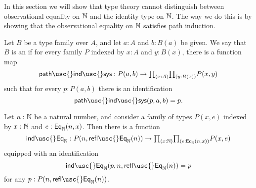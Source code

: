 In this section we will show that type theory cannot distinguish between observational equality on $\mathbb{N}$ and the identity type on $\mathbb{N}$. The way we do this is by showing that the observational equality on $\mathbb{N}$ satisfies path induction.

\begin{defn}
  Let $B$ be a type family over $A$, and let $a:A$ and $b:B(a)$ be given. We say that $B$ is an  if for every family $P$ indexed by $x:A$ and $y:B(x)$, there is a function map
  \begin{equation*}
    \mathsf{path\usc{}ind\usc{}sys}:P(a,b)\to \prd{x:A}{y:B(x)}P(x,y)
  \end{equation*}
  such that for every $p:P(a,b)$ there is an identification
  \begin{equation*}
    \mathsf{path\usc{}ind\usc{}sys}(p,a,b)=p.
  \end{equation*}
\end{defn}

\begin{thm}
  Let $n:\mathbb{N}$ be a natural number, and consider a family of types $P(x,e)$ indexed by $x:\mathbb{N}$ and $e:\mathsf{Eq}_\mathbb{N}(n,x)$. Then there is a function
  \begin{equation*}
    \mathsf{ind\usc{}Eq}_\N:P(n,\mathsf{refl\usc{}Eq}_\N(n))\to\prd{x:\N}{e:\EqN(n,x)}P(x,e)
  \end{equation*}
  equipped with an identification
  \begin{equation*}
    \mathsf{ind\usc{}Eq}_\N(p,n,\mathsf{refl\usc{}Eq}_\N(n))= p
  \end{equation*}
  for any $p:P(n,\mathsf{refl\usc{}Eq}_\N(n))$.
\end{thm}

